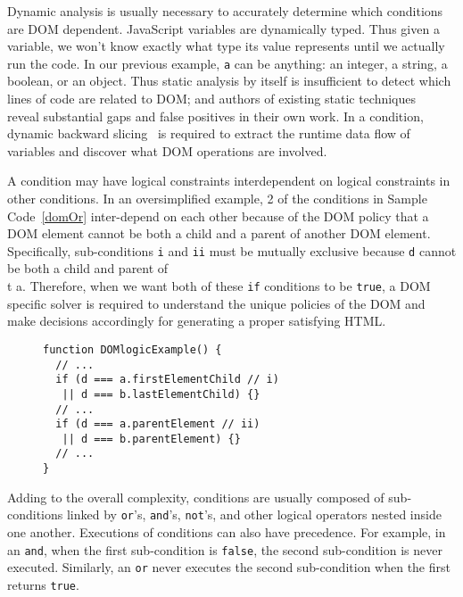 Dynamic analysis is usually necessary to accurately determine which conditions are DOM dependent.  
JavaScript variables are dynamically typed.  Thus given a variable, we won't know exactly what type its value represents until we actually run the code.  
In our previous example, {\tt a} can be anything: an integer, a string, a boolean, or an object.  
Thus static analysis by itself is insufficient to detect which lines of code are related to DOM; and authors of existing static techniques~\cite{staticJsWWW09, staticJsWWW11} reveal substantial gaps and false positives in their own work.  
In a condition, dynamic backward slicing~\cite{} is required to extract the runtime data flow of variables and discover what DOM operations are involved.  

A condition may have logical constraints interdependent on logical constraints in other conditions.  
In an oversimplified example, 2 of the conditions in Sample Code~\ref{domOr} inter-depend on each other because of the DOM policy that a DOM element cannot be both a child and a parent of another DOM element.  
Specifically, sub-conditions {\tt i} and {\tt ii} must be mutually exclusive because {\tt d} cannot be both a child and parent of {\\t a}.
Therefore, when we want both of these {\tt if} conditions to be {\tt true}, a DOM specific solver is required to understand the unique policies of the DOM and make decisions accordingly for generating a proper satisfying HTML.
\begin{figure}
\begin{lstlisting}[caption=Example code showing conditions that have logical constraints interdepenent with each other.,label=domOr]  
function DOMlogicExample() {
  // ...
  if (d === a.firstElementChild // i)
   || d === b.lastElementChild) {}
  // ... 
  if (d === a.parentElement // ii)
   || d === b.parentElement) {}
  // ...
}
\end{lstlisting}
\end{figure}

Adding to the overall complexity, conditions are usually composed of sub-conditions linked by {\tt or}'s, {\tt and}'s, {\tt not}'s, and other logical operators nested inside one another.
Executions of conditions can also have precedence.  For example, in an {\tt and}, when the first sub-condition is {\tt false}, the second sub-condition is never executed.  Similarly, an {\tt or} never executes the second sub-condition when the first returns {\tt true}.


